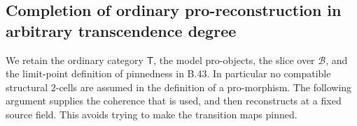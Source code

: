 \documentclass[11pt,a4paper]{article}
\begin{document}
\subsection{Completion of ordinary pro-reconstruction in arbitrary transcendence degree}

We retain the ordinary category \(\mathsf T\), the model pro-objects,
the slice over \(\mathcal B\), and the limit-point definition of
pinnedness in B.43. In particular no compatible structural 2-cells
are assumed in the definition of a pro-morphism. The following
argument supplies the coherence that is used, and then reconstructs
at a fixed source field. This avoids trying to make the transition
maps pinned.
\end{document}
